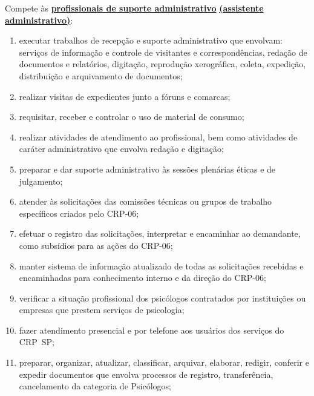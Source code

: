 Compete às
\href{https://transparencia.cfp.org.br/crp06/wp-content/uploads/sites/29/2023/03/Resolucao-CRP-002-2023.pdf}{\textbf{profissionais
    de suporte administrativo}}
\href{https://transparencia.cfp.org.br/crp06/wp-content/uploads/sites/29/2022/09/Resolucao-03-22-PECS-Anexo-II-Regulamentacao-Plano-de-Empregos-Carreiras-e-Salarios-f-assinada.pdf}{\textbf{(assistente
    administrativo)}}:

\begin{enumerate}

  \item
        executar trabalhos de recepção e suporte administrativo que envolvam:
        serviços de informação e controle de visitantes e correspondências,
        redação de documentos e relatórios, digitação, reprodução xerográfica,
        coleta, expedição, distribuição e arquivamento de documentos;
  \item
        realizar visitas de expedientes junto a fóruns e comarcas;
  \item
        requisitar, receber e controlar o uso de material de consumo;
  \item
        realizar atividades de atendimento ao profissional, bem como
        atividades de caráter administrativo que envolva redação e digitação;
  \item
        preparar e dar suporte administrativo às sessões plenárias éticas e de
        julgamento;
  \item
        atender às solicitações das comissões técnicas ou grupos de trabalho
        específicos criados pelo CRP-06;
  \item
        efetuar o registro das solicitações, interpretar e encaminhar ao
        demandante, como subsídios para as ações do CRP-06;
  \item
        manter sistema de informação atualizado de todas as solicitações
        recebidas e encaminhadas para conhecimento interno e da direção do
        CRP-06;
  \item
        verificar a situação profissional dos psicólogos contratados por
        instituições ou empresas que prestem serviços de psicologia;
  \item
        fazer atendimento presencial e por telefone aos usuários dos serviços
        do CRP~SP;
  \item
        preparar, organizar, atualizar, classificar, arquivar, elaborar,
        redigir, conferir e expedir documentos que envolva processos de
        registro, transferência, cancelamento da categoria de Psicólogos;

\end{enumerate}
